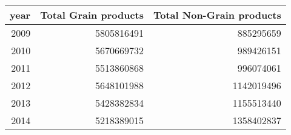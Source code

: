 
\begin{tabular}{r|r|r}
\hline
year & Total Grain products & Total Non-Grain products\\
\hline
2009 & 5805816491 & 885295659\\
\hline
2010 & 5670669732 & 989426151\\
\hline
2011 & 5513860868 & 996074061\\
\hline
2012 & 5648101988 & 1142019496\\
\hline
2013 & 5428382834 & 1155513440\\
\hline
2014 & 5218389015 & 1358402837\\
\hline
\end{tabular}
